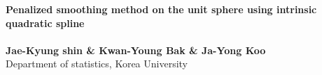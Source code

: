 \documentclass[a0,portrait]{a0poster}
\begin{document}


\begin{minipage}[b]{0.75\linewidth}
\veryHuge
\color{NavyBlue}
\textbf{Penalized smoothing method on the unit sphere using intrinsic quadratic spline}
\\ %
\\
\huge
\color{Black}
\textbf{Jae-Kyung shin \& Kwan-Young Bak \& Ja-Yong Koo} \\[0.5cm] %
Department of statistics, Korea University \\[0.4cm] %
\end{minipage}
%

\vspace{1cm} %

\end{document}
